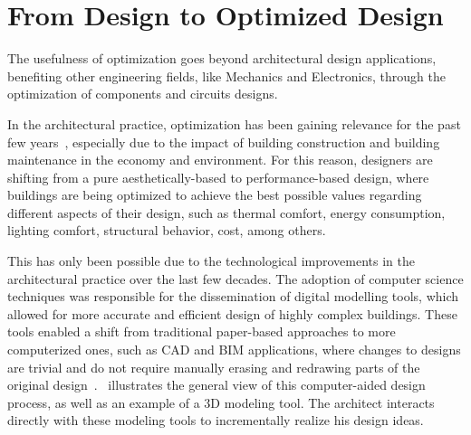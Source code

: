 \section{From Design to Optimized Design}
	
	The usefulness of optimization goes beyond architectural design applications, benefiting other engineering fields, like Mechanics and Electronics, through the optimization of components and circuits designs. 
	
	In the architectural practice, optimization has been gaining relevance for the past few years~\cite{Cichocka2017SURVEY}, especially due to the impact of building construction and building maintenance in the economy and environment. For this reason, designers are shifting from a pure aesthetically-based to performance-based design, where buildings are being optimized to achieve the best possible values regarding different aspects of their design, such as thermal comfort, energy consumption, lighting comfort, structural behavior, cost, among others.

	This has only been possible due to the technological improvements in the architectural practice over the last few decades. The adoption of computer science techniques was responsible for the dissemination of digital modelling tools, which allowed for more accurate and efficient design of highly complex buildings. These tools enabled a shift from traditional paper-based approaches to more computerized ones, such as \ac{CAD} and \ac{BIM} applications, where changes to designs are trivial and do not require manually erasing and redrawing parts of the original design~\cite{Ferreira2015GD}.~ illustrates the general view of this computer-aided design process, as well as an example of a 3D modeling tool. The architect interacts directly with these modeling tools to incrementally realize his design ideas.
	
